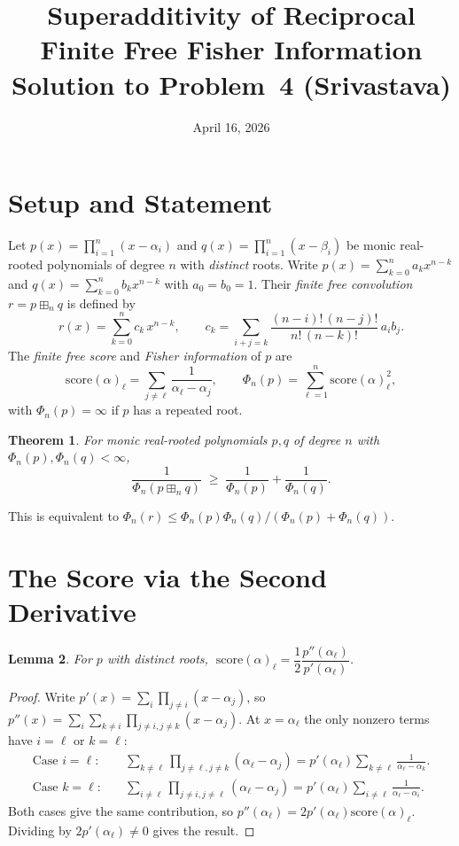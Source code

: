 \documentclass[12pt]{article}
\title{Superadditivity of Reciprocal Finite Free Fisher Information\\[4pt]
\large Solution to Problem~4 (Srivastava)}
\author{}
\date{April 16, 2026}
\newtheorem{theorem}{Theorem}
\newtheorem{lemma}[theorem]{Lemma}
\theoremstyle{definition}
\newcommand{\score}{\mathrm{score}}
\begin{document}
\maketitle

\section{Setup and Statement}

Let $p(x)=\prod_{i=1}^n(x-\alpha_i)$ and $q(x)=\prod_{i=1}^n(x-\beta_i)$ be monic real-rooted
polynomials of degree $n$ with \emph{distinct} roots.  Write $p(x)=\sum_{k=0}^n a_k x^{n-k}$
and $q(x)=\sum_{k=0}^n b_k x^{n-k}$ with $a_0=b_0=1$.  Their \emph{finite free convolution}
$r=p\boxplus_n q$ is defined by
\begin{equation}\label{eq:ffc}
  r(x)=\sum_{k=0}^n c_k\,x^{n-k},\qquad
  c_k = \sum_{i+j=k}\frac{(n-i)!\,(n-j)!}{n!\,(n-k)!}\,a_i b_j.
\end{equation}
The \emph{finite free score} and \emph{Fisher information} of $p$ are
\[
  \score(\alpha)_\ell = \sum_{j\neq\ell}\frac{1}{\alpha_\ell-\alpha_j},
  \qquad
  \Phi_n(p) = \sum_{\ell=1}^n\score(\alpha)_\ell^2,
\]
with $\Phi_n(p)=\infty$ if $p$ has a repeated root.

\begin{theorem}\label{thm:main}
For monic real-rooted polynomials $p,q$ of degree $n$ with $\Phi_n(p),\Phi_n(q)<\infty$,
\[
  \frac{1}{\Phi_n(p\boxplus_n q)}\;\ge\;\frac{1}{\Phi_n(p)}+\frac{1}{\Phi_n(q)}.
\]
\end{theorem}

This is equivalent to $\Phi_n(r)\le\Phi_n(p)\Phi_n(q)/(\Phi_n(p)+\Phi_n(q))$.

\section{The Score via the Second Derivative}

\begin{lemma}\label{lem:score-deriv}
For $p$ with distinct roots, $\;\score(\alpha)_\ell = \dfrac{1}{2}\dfrac{p''(\alpha_\ell)}{p'(\alpha_\ell)}$.
\end{lemma}

\begin{proof}
Write $p'(x)=\sum_i\prod_{j\neq i}(x-\alpha_j)$, so
$p''(x)=\sum_i\sum_{k\neq i}\prod_{j\neq i,j\neq k}(x-\alpha_j)$.
At $x=\alpha_\ell$ the only nonzero terms have $i=\ell$ or $k=\ell$:
\begin{align*}
  \text{Case }i=\ell: &\quad \sum_{k\neq\ell}\prod_{j\neq\ell,j\neq k}(\alpha_\ell-\alpha_j)
    =p'(\alpha_\ell)\sum_{k\neq\ell}\tfrac{1}{\alpha_\ell-\alpha_k}.\\
  \text{Case }k=\ell: &\quad \sum_{i\neq\ell}\prod_{j\neq i,j\neq\ell}(\alpha_\ell-\alpha_j)
    =p'(\alpha_\ell)\sum_{i\neq\ell}\tfrac{1}{\alpha_\ell-\alpha_i}.
\end{align*}
Both cases give the same contribution, so $p''(\alpha_\ell)=2p'(\alpha_\ell)\score(\alpha)_\ell$.
Dividing by $2p'(\alpha_\ell)\neq 0$ gives the result.
\end{proof}
\end{document}
